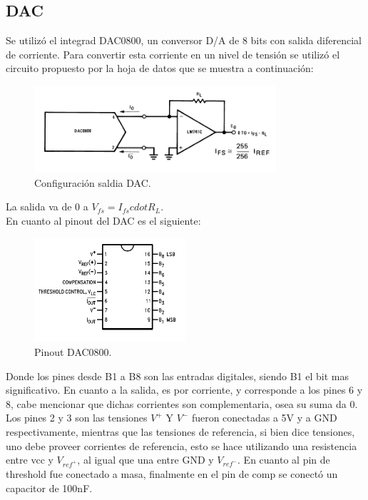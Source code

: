 \subsection{DAC}
Se utilizó el integrad DAC0800, un conversor D/A de 8 bits con salida diferencial de corriente.
Para convertir esta corriente en un nivel de tensión se utilizó el circuito propuesto por la hoja de datos que se muestra a continuación:
\begin{figure}[H]
	\centering
	\includegraphics[width=0.8\textwidth]{ImagenesEjercicio1/dacout.png}
\caption{Configuración saldia DAC.}
	\label{fig:dacout}
\end{figure}
La salida va de 0 a $V_{fs}= I_{fs}cdot R_L$.\\
En cuanto al pinout del DAC es el siguiente:
\begin{figure}[H]
	\centering
	\includegraphics[width=0.5\textwidth]{ImagenesEjercicio1/dacpinout.png}
\caption{Pinout DAC0800.}
	\label{fig:dapinout}
\end{figure}
Donde los pines desde B1 a B8 son las entradas digitales, siendo B1 el bit mas significativo. En cuanto a la salida, es por corriente, y corresponde a los pines 6 y 8, cabe mencionar que dichas corrientes son complementaria, osea su suma da 0. Los pines 2 y 3 son las tensiones $V^+$ Y $V^-$ fueron conectadas a 5V y a GND respectivamente, mientras que las tensiones de referencia, si bien dice tensiones, uno debe proveer corrientes de referencia, esto se hace utilizando una resistencia entre vcc y $V_{ref^+}$, al igual que una entre GND y $V_{ref^-}$. En cuanto al pin de threshold fue conectado a masa, finalmente en el pin de comp se conectó un capacitor de 100nF.
